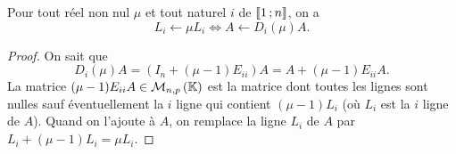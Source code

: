 %
\begin{prop}
  Pour tout réel non nul \(\mu\) et tout naturel \(i\) de 
  \(\mathopen{\llbracket}1\mathclose{}\mathpunct{};n\mathclose{\rrbracket}\), on a
  \begin{equation}
    L_i \leftarrow \mu L_i \iff A \leftarrow D_i(\mu)A.
  \end{equation}
\end{prop}
\begin{proof}
  On sait que
  \begin{equation}
    D_i(\mu) A = (I_n + (\mu-1) E_{ii})A= A + (\mu-1)E_{ii}A.
  \end{equation}
  La matrice \((\mu-1)E_{ii}A \in \mathcal{M}_{n,p}\left(\mathbb{K}\right)\) est la matrice dont toutes 
  les lignes sont nulles sauf éventuellement la \(i\)\ieme{} ligne qui contient 
  \((\mu-1)L_i\) (où \(L_i\) est la \(i\)\ieme{} ligne de \(A\)). Quand on 
  l'ajoute à \(A\), on remplace la ligne \(L_i\) de \(A\) par \(L_i +(\mu-1) L_i 
  = \mu L_i\).
\end{proof}
%

